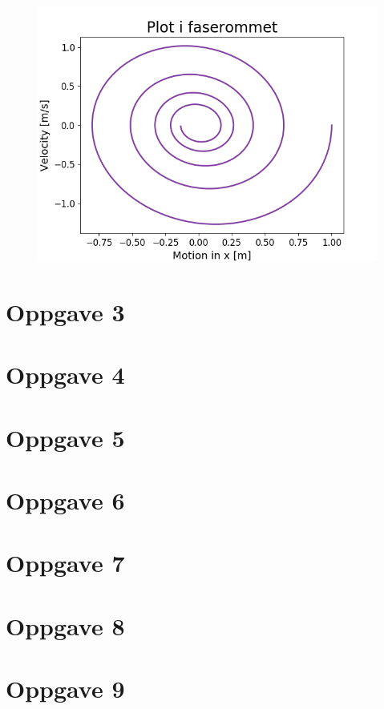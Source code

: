 \documentclass[norsk,a4paper,12pt]{article}
\begin{document}
\begin{figure}
\includegraphics[scale=1]{Oppgave2.png}
\end{figure}


\section*{Oppgave 3}

\section*{Oppgave 4}

\section*{Oppgave 5}

\section*{Oppgave 6}

\section*{Oppgave 7}

\section*{Oppgave 8}

\section*{Oppgave 9}
\end{document}

